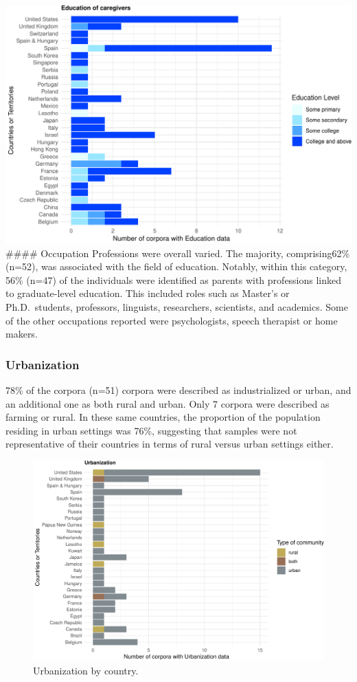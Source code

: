 \documentclass[
  man,floatsintext]{apa6}
\begin{document}
\includegraphics{CHILDES_short_files/figure-latex/figure3 -1.pdf}
\#\#\#\# Occupation
Professions were overall varied. The majority, comprising62\% (n=52), was associated with the field of education. Notably, within this category, 56\% (n=47) of the individuals were identified as parents with professions linked to graduate-level education. This included roles such as Master's or Ph.D.~students, professors, linguists, researchers, scientists, and academics. Some of the other occupations reported were psychologists, speech therapist or home makers.

\subsubsection{Urbanization}\label{urbanization-1}

78\% of the corpora (n=51) corpora were described as industrialized or urban, and an additional one as both rural and urban. Only 7 corpora were described as farming or rural. In these same countries, the proportion of the population residing in urban settings was 76\%, suggesting that samples were not representative of their countries in terms of rural versus urban settings either.

\begin{figure}
\centering
\includegraphics{CHILDES_short_files/figure-latex/figure4-1.pdf}
\caption{\label{fig:figure4}Urbanization by country.}
\end{figure}
\end{document}
